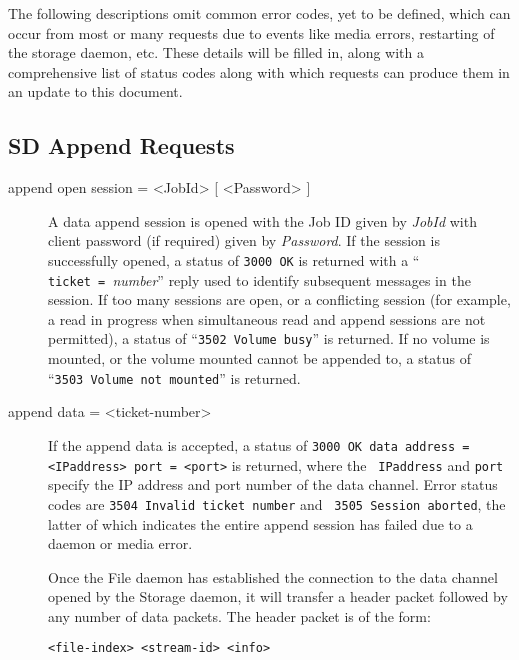 The following descriptions omit common error codes, yet to be defined, which
can occur from most or many requests due to events like media errors,
restarting of the storage daemon, etc. These details will be filled in, along
with a comprehensive list of status codes along with which requests can
produce them in an update to this document.

\subsection{SD Append Requests}

\begin{description}

\item [{append open session = {\textless}JobId{\textgreater} [  {\textless}Password{\textgreater} ]  }]
   A data append session is opened with the Job ID given by  {\it JobId} with
client password (if required) given by {\it Password}.  If the session is
successfully opened, a status of {\tt 3000\ OK} is  returned with a ``{\tt
ticket\ =\ }{\it number}'' reply used to  identify subsequent messages in the
session. If too many sessions are open, or  a conflicting session (for
example, a read in progress when simultaneous read  and append sessions are
not permitted), a status of  ``{\tt 3502\ Volume\ busy}'' is returned. If no
volume is mounted, or  the volume mounted cannot be appended to, a status of
``{\tt 3503\ Volume\ not\ mounted}'' is returned.

\item [append data = {\textless}ticket-number{\textgreater}  ]
   If the append data is accepted, a  status of {\tt 3000\ OK data address =
{\textless}IPaddress{\textgreater} port = {\textless}port{\textgreater}} is returned,  where the {\tt
IPaddress} and {\tt port} specify the IP address and  port number of the data
channel. Error status codes are  {\tt 3504\ Invalid\ ticket\ number} and  {\tt
3505\ Session\ aborted}, the latter of which indicates the  entire append
session has failed due to a daemon or media error.

Once the File daemon has established the connection to the data channel
opened by the Storage daemon, it will transfer a header packet followed  by
any number of data packets. The header packet is of the form:

{\tt {\textless}file-index{\textgreater} {\textless}stream-id{\textgreater} {\textless}info{\textgreater}}


\end{description}
